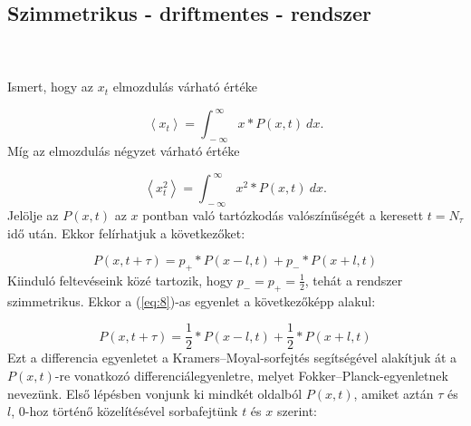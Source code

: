 \section{} \label{sec:3}
\subsection{Szimmetrikus - driftmentes - rendszer} \label{subsec:3.1}
\\ \\
Ismert, hogy az $x_{t}$ elmozdulás várható értéke

\begin{equation} \label{eq:6}
    \left< x_{t} \right>
    =
    \int_{\ -\infty}^{\ \infty} x * P \left( x, t \right)\ dx.
\end{equation}
Míg az elmozdulás négyzet várható értéke

\begin{equation} \label{eq:7}
    \left< x_{t}^{2} \right>
    =
    \int_{\ -\infty}^{\ \infty} x^{2} * P \left( x, t \right)\ dx.
\end{equation}
Jelölje az $P \left( x, t \right)$ az $x$ pontban való tartózkodás valószínűségét a keresett $t = N_\tau$ idő után. Ekkor felírhatjuk a következőket\cite{randwalk}:

\begin{equation} \label{eq:8}
    P \left( x, t + \tau \right)
    =
    p_{+} * P \left( x - l, t \right) + p_{-} * P \left( x + l, t \right)
\end{equation}
Kiinduló feltevéseink közé tartozik, hogy $p_{-} = p_{+} = \frac{1}{2}$, tehát a rendszer szimmetrikus. Ekkor a (\ref{eq:8})-as egyenlet a következőképp alakul:

\begin{equation} \label{eq:9}
    P \left( x, t + \tau \right)
    =
    \frac{1}{2} * P \left( x - l, t \right) + \frac{1}{2} * P \left( x + l, t \right)
\end{equation}
Ezt a differencia egyenletet a Kramers--Moyal-sorfejtés segítségével alakítjuk át a $P \left( x, t \right)$-re vonatkozó differenciálegyenletre, melyet Fokker--Planck-egyenletnek nevezünk\cite{2007cond.mat..1242G}. Első lépésben vonjunk ki mindkét oldalból $P \left( x, t \right)$, amiket aztán $\tau$ és $l$, $0$-hoz történő közelítésével sorbafejtünk $t$ és $x$ szerint:

